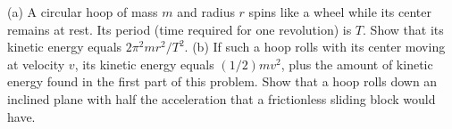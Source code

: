 (a) A circular hoop of mass $m$ and radius $r$ spins
like a wheel while its center remains at rest. Its period
(time required for one revolution) is $T$. Show that its
kinetic energy equals $2\pi^2mr^2/T^2$.\hwendpart
 (b) If such a
hoop rolls with its center moving at velocity $v$, its
kinetic energy equals $(1/2)mv^2$, plus the amount
of kinetic energy found in the first part of this problem.
Show that a hoop rolls down an inclined plane with half the
acceleration that a frictionless sliding block would have.
